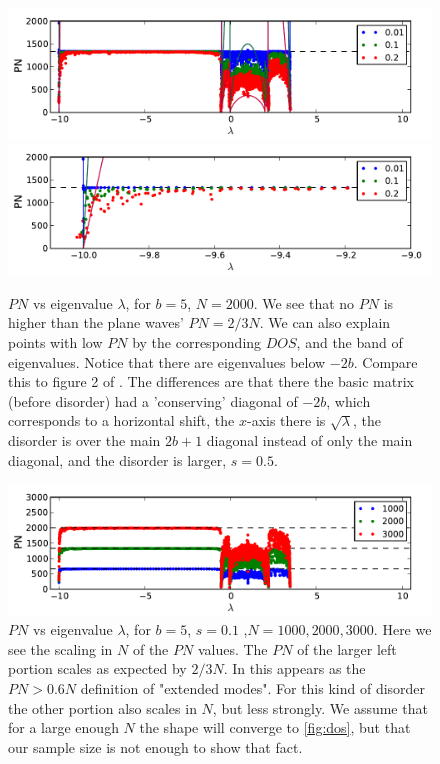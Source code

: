 \documentclass[onecolumn,fleqn,longbibliography]{revtex4}
\begin{document}
\begin{figure}[H]
    \includegraphics{pta_anderson_ddonly_b5}\\
    \includegraphics{pta_anderson_ddonly_b5_zoom}
    \caption{$PN$ vs eigenvalue $\lambda$, for $b=5$, $N=2000$. We see that
    no $PN$ is higher than the plane waves' $PN =2/3 N$. We can also explain
    points with low $PN$ by the corresponding $DOS$, and the band of eigenvalues. 
    Notice that there are eigenvalues below $-2b$.
    Compare this to figure 2 of \cite{bodyfelt_scaling_2013}. The 
    differences are that there the basic matrix (before disorder) had a 'conserving' diagonal of $-2b$,
    which corresponds to a horizontal shift, the $x$-axis there is $\sqrt{\lambda}$,
    the disorder is over the main $2b+1$ diagonal instead of only the main diagonal, 
    and the disorder is larger, $s=0.5$.}
    \label{fig:ddonly_b5}
\end{figure}


\begin{figure}[H]
    \includegraphics{pta_anderson_byN}
    \caption{$PN$ vs eigenvalue $\lambda$, for $b=5$, $s=0.1$ ,$N={{1000,2000,3000}}$. 
    Here we see the scaling in $N$ of the $PN$ values. The $PN$ of the 
    larger left portion scales as expected by $2/3 N$. In 
    \cite{bodyfelt_scaling_2013} this appears as the $PN>0.6N$ definition 
    of "extended modes". For this kind of disorder the other portion
    also scales in $N$, but less strongly. We assume that for a large enough
    $N$ the shape will converge to \autoref{fig:dos}, but that our sample
    size is not enough to show that fact. }
    \label{fig:anderson_byN}
\end{figure}
\end{document}
